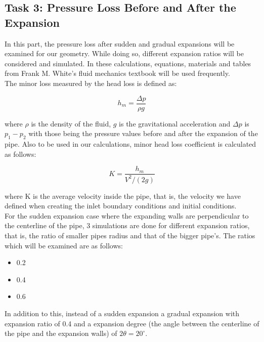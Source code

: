 \subsection{Task 3: Pressure Loss Before and After the Expansion}
\label{sec:task3intro}

In this part, the pressure loss after sudden and gradual expansions will be examined for our geometry. 
While doing so, different expansion ratios will be considered and simulated. In these calculations, equations, materials and tables from Frank M. White's fluid mechanics textbook \cite{white_chul_2016} will be used frequently.\\


\noindent The minor loss measured by the head loss is defined \cite{white_chul_2016} as:

\begin{equation}
    h_m = \frac{\Delta p}{\rho g}
    \label{eq:hm}
\end{equation}

\noindent where $\rho$ is the density of the fluid, $g$ is the gravitational acceleration and $\Delta p$ is $p_1 - p_2$ with those being the pressure values before and after the expansion of the pipe. Also to be used in our calculations, minor head loss coefficient is calculated as follows:

\begin{equation}
    K = \frac{h_m}{V^2 / (2g)}
    \label{eq:headlosscoeff}
\end{equation}

\noindent where K is the average velocity inside the pipe, that is, the velocity we have defined when creating the inlet boundary conditions and initial conditions. \\

\noindent For the sudden expansion case where the expanding walls are perpendicular to the centerline of the pipe, 3 simulations are done for different expansion ratios, that is, the ratio of smaller pipes radius and that of the bigger pipe's. The ratios which will be examined are as follows:

\begin{itemize}
    \item 0.2
    \item 0.4
    \item 0.6
\end{itemize}

\noindent In addition to this, instead of a sudden expansion a gradual expansion with expansion ratio of 0.4 and a expansion degree (the angle between the centerline of the pipe and the expansion walls) of $2\theta = 20^{\circ}$.


